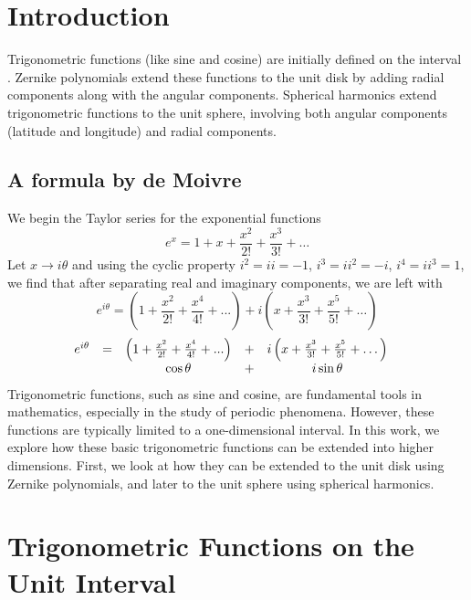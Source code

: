 % 
%
\section{Introduction}
Trigonometric functions (like sine and cosine) are initially defined on the interval .
Zernike polynomials extend these functions to the unit disk by adding radial components along with the angular components.
Spherical harmonics extend trigonometric functions to the unit sphere, involving both angular components (latitude and longitude) and radial components.

\subsection{A formula by de Moivre}
We begin the Taylor series for the exponential functions%
%
\begin{equation}
	e^{x} = 1 + x + \frac{x^{2}}{2!} + \frac{x^{3}}{3!} + \dots
\label{eq:exp}
\end{equation}
%
Let $x\to i \theta$ and using the cyclic property $i^{2} = i i = -1$, $i^{3} = i i^{2} = -i$,  $i^{4} = i i^{3} = 1$, we find that after separating real and imaginary components, we are left with
%
\begin{equation}
	e^{i \theta} = \left(1 + \frac{x^{2}}{2!} +  \frac{x^{4}}{4!} + ... \right) + i \left( x + \frac{x^{3}}{3!} +  \frac{x^{5}}{5!} + \dots \right)
\label{eq:exp}
\end{equation}
%
\begin{equation}
\begin{array}{ccc ccc}
	e^{i \theta} &= &\left(1 + \frac{x^{2}}{2!} +  \frac{x^{4}}{4!} + ... \right) &+ & i \left( x + \frac{x^{3}}{3!} +  \frac{x^{5}}{5!} + \dots \right)\\
		&&\cos \theta &+ &i \sin \theta &
\end{array}
\label{eq:de-Moivre}
\end{equation}
%
Trigonometric functions, such as sine and cosine, are fundamental tools in mathematics, especially in the study of periodic phenomena. However, these functions are typically limited to a one-dimensional interval. In this work, we explore how these basic trigonometric functions can be extended into higher dimensions. First, we look at how they can be extended to the unit disk using Zernike polynomials, and later to the unit sphere using spherical harmonics.

\section{Trigonometric Functions on the Unit Interval}

